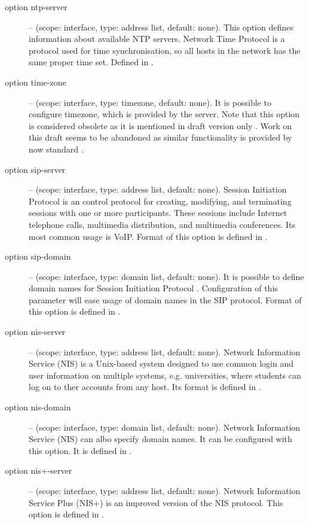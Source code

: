 \begin{description}
 \item[option ntp-server] -- (scope: interface, type: address list, default:
   none). This option defines information about available NTP
   servers. Network Time Protocol \cite{rfc2030} is a protocol used
   for time synchronisation, so all hosts in the network has the same
   proper time set. Defined in \cite{rfc4075}.

 \item[option time-zone] -- (scope: interface, type: timezone, default:
   none). It is possible to configure timezone, which is provided by
   the server. Note that this option is considered obsolete as it is
   mentioned in draft version only \cite{draft-timezone}. Work on this
   draft seems to be abandoned as similar functionality is provided by
   now standard \cite{rfc4075}.

 \item[option sip-server] -- (scope: interface, type: address list, default:
   none). Session Initiation Protocol \cite{rfc3263} is an control
   protocol for creating, modifying, and terminating sessions with one
   or more participants. These sessions include Internet telephone
   calls, multimedia distribution, and multimedia conferences. Its
   most common usage is VoIP. Format of this option is defined in
   \cite{rfc3319}.

 \item[option sip-domain] -- (scope: interface, type: domain list, default:
   none). It is possible to define domain names for Session Initiation
   Protocol \cite{rfc3263}. Configuration of this parameter will ease
   usage of domain names in the SIP protocol. Format of this option is
   defined in \cite{rfc3319}.

 \item[option nis-server] -- (scope: interface, type: address list, default:
   none). Network Information Service (NIS) is a Unix-based system
   designed to use common login and user information on multiple
   systems, e.g. universities, where students can log on to ther
   accounts from any host. Its format is defined in \cite{rfc3898}.

 \item[option nis-domain] -- (scope: interface, type: domain list, default:
   none). Network Information Service (NIS) can albo specify domain
   names. It can be configured with this option. It is defined in
   \cite{rfc3898}.

 \item[option nis+-server] -- (scope: interface, type: address list, default:
   none). Network Information Service Plus (NIS+) is an improved
   version of the NIS protocol. This option is defined in
   \cite{rfc3898}.


\end{description}
